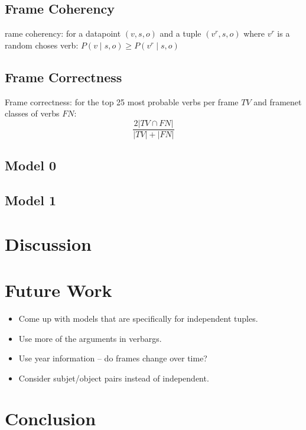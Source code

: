 \documentclass[11pt,twocolumn,DIV=11]{scrartcl}
\begin{document}
\subsection{Frame Coherency}
rame coherency: for a datapoint $(v,s,o)$ and a tuple $(v^r,s,o)$ where $v^r$ is a random choses verb: $P(v\mid s,o) \geq P(v^r\mid s,o)$  
\subsection{Frame Correctness}

Frame correctness: for the top 25 most probable verbs per frame $TV$ and framenet classes of verbs $FN$: \[\frac{2|TV\cap FN|}{|TV|+|FN|}\]

\subsection{Model 0}
\subsection{Model 1}


\section{Discussion}


\section{Future Work}
\begin{itemize}
\item Come up with models that are specifically for independent tuples.
\item Use more of the arguments in verbargs.
\item Use year information -- do frames change over time?
\item Consider subjet/object pairs instead of independent.
\end{itemize}

\section{Conclusion}



\end{document}

